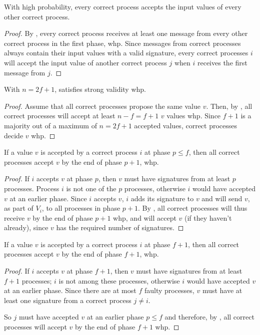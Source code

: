 \begin{lemma}\label{lem:all-accept}
    With high probability, every correct process accepts the input values of every other correct process.
\end{lemma}
\begin{proof}
    By , every correct process receives at least one message from every other correct process in the first phase, whp. Since messages from correct processes always contain their input values with a valid signature, every correct processes $i$ will accept the input value of another correct process $j$ when $i$ receives the first message from $j$. 
\end{proof}

\begin{theorem}
    With $n=2f+1$,  satisfies strong validity whp.
\end{theorem}
\begin{proof}
    Assume that all correct processes propose the same value $v$. Then, by , all correct processes will accept at least $n-f=f+1$ $v$ values whp. Since $f+1$ is a majority out of a maximum of $n=2f+1$ accepted values, correct processes decide $v$ whp.
\end{proof}

\begin{lemma}\label{lem:accept-early}
    If a value $v$ is accepted by a correct process $i$ at phase $p \leq f$, then all correct processes accept $v$ by the end of phase $p+1$, whp.
\end{lemma}
\begin{proof}
    If $i$ accepts $v$ at phase $p$, then $v$ must have signatures from at least $p$ processes. Process $i$ is not one of the $p$ processes, otherwise $i$ would have accepted $v$ at an earlier phase. Since $i$ accepts $v$, $i$ adds its signature to $v$ and will send $v$, as part of $V_i$, to all processes in phase $p+1$. By , all correct processes will thus receive $v$ by the end of phase $p+1$ whp, and will accept $v$ (if they haven't already), since $v$ has the required number of signatures.
\end{proof}

\begin{lemma}\label{lem:accept-last}
    If a value $v$ is accepted by a correct process $i$ at phase $f+1$, then all correct processes accept $v$ by the end of phase $f+1$, whp.
\end{lemma}
\begin{proof}
    If $i$ accepts $v$ at phase $f+1$, then $v$ must have signatures from at least $f+1$ processes; $i$ is not among these processes, otherwise $i$ would have accepted $v$ at an earlier phase. Since there are at most $f$ faulty processes, $v$ must have at least one signature from a correct process $j \ne i$.

    So $j$ must have accepted $v$ at an earlier phase $p \leq f$ and therefore, by , all correct processes will accept $v$ by the end of phase $f+1$ whp.
\end{proof}

